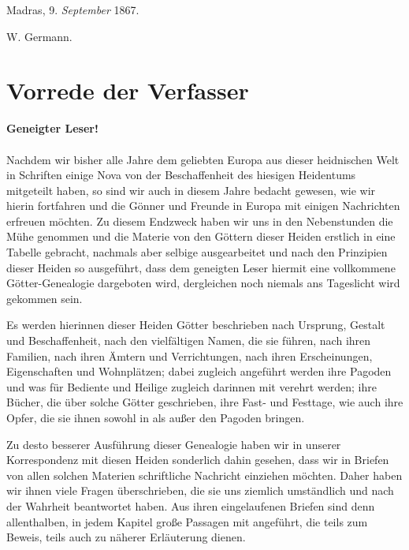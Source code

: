 \documentclass{article}
\begin{document}
\bigskip

Madras, 9. \emph{September} 1867.

\bigskip

\hspace*{20mm}W. Germann.

\clearpage
\section*{Vorrede der Verfasser}
\begin{center}
\textbf{Geneigter Leser!}
\end{center}
\paragraph{}
Nachdem wir bisher alle Jahre dem geliebten Europa aus dieser heidnischen Welt in Schriften einige Nova von der Beschaffenheit des hiesigen Heidentums mitgeteilt haben, so sind wir auch in diesem Jahre bedacht gewesen, wie wir hierin fortfahren und die Gönner und Freunde in Europa mit einigen Nachrichten erfreuen möchten. Zu diesem Endzweck haben wir uns in den Nebenstunden die Mühe genommen und die Materie von den Göttern dieser Heiden erstlich in eine Tabelle gebracht, nachmals aber selbige ausgearbeitet und nach den Prinzipien dieser Heiden so ausgeführt, dass dem geneigten Leser hiermit eine vollkommene Götter-Genealogie dargeboten wird, dergleichen noch niemals ans Tageslicht wird gekommen sein.

Es werden hierinnen dieser Heiden Götter beschrieben nach Ursprung, Gestalt und Beschaffenheit, nach den vielfältigen Namen, die sie führen, nach ihren Familien, nach ihren Ämtern und Verrichtungen, nach ihren Erscheinungen, Eigenschaften und Wohnplätzen; dabei zugleich angeführt werden ihre Pagoden und was für Bediente und Heilige zugleich darinnen mit verehrt werden; ihre Bücher, die über solche Götter geschrieben, ihre Fast- und Festtage, wie auch ihre Opfer, die sie ihnen sowohl in als außer den Pagoden bringen.

Zu desto besserer Ausführung dieser Genealogie haben wir in unserer Korrespondenz mit diesen Heiden sonderlich dahin gesehen, dass wir in Briefen von allen solchen Materien schriftliche Nachricht einziehen möchten. Daher haben wir ihnen viele Fragen überschrieben, die sie uns ziemlich umständlich und nach der Wahrheit beantwortet haben. Aus ihren eingelaufenen Briefen sind denn allenthalben, in jedem Kapitel große Passagen mit angeführt, die teils zum Beweis, teils auch zu näherer Erläuterung dienen.
\end{document}
